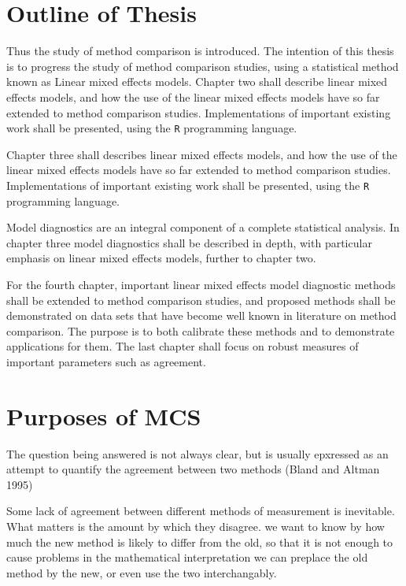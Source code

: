 \documentclass[12pt, a4paper]{report}
\theoremstyle{plain}
\theoremstyle{definition}
\theoremstyle{remark}
\begin{document}
	\section{Outline of Thesis}
	Thus the study of method comparison is introduced. The intention of this thesis is to progress the
	study of method comparison studies, using a statistical method known as Linear mixed effects models.
	Chapter two shall describe linear mixed effects models, and how the use of the linear mixed
	effects models have so far extended to method comparison studies. Implementations of important existing work shall be presented, using the \texttt{R} programming language.
	

	
	Chapter three shall describes linear mixed effects models, and how the use of the linear mixed effects models have so far extended to method comparison studies. Implementations of important existing work shall be presented, using the \texttt{R} programming language.
	
	Model diagnostics are an integral component of a complete statistical analysis.
	In chapter three model diagnostics shall be described in depth, with particular
	emphasis on linear mixed effects models, further to chapter two.
	
	For the fourth chapter, important linear mixed effects model diagnostic methods shall be extended to method comparison studies, and proposed methods shall be demonstrated on data sets that have become well known in literature on method comparison. The purpose is to both calibrate these methods and to demonstrate applications for them.
	The last chapter shall focus on robust measures of important parameters such as agreement.
	
	
	\section{Purposes of MCS}
	
	The  question being answered is not always clear, but is usually epxressed as an attempt to quantify the agreement
	between two methods (Bland and Altman 1995)
	
	Some lack of agreement between different methods of measurement is inevitable. What matters is the amount by which they
	disagree. we want to know by how much the new method is likely to differ from the old, so that it is not enough to cause
	problems in the mathematical interpretation we can preplace the old method by the new, or even use the two interchangably.
	
\end{document}

